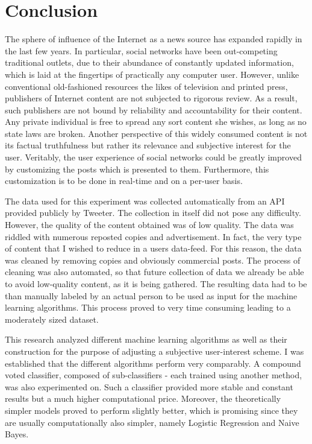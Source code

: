 \section{Conclusion}	
	The sphere of influence of the Internet as a news source has expanded rapidly in the last few years. In particular, social networks have been out-competing traditional outlets, due to their abundance of constantly updated information, which is laid at the fingertips of practically any computer user. However, unlike conventional old-fashioned resources the likes of television and printed press, publishers of Internet content are not subjected to rigorous review. As a result, such publishers are not bound by reliability and accountability for their content. Any private individual is free to spread any sort content she wishes, as long as no state laws are broken. Another perspective of this widely consumed content is not its factual truthfulness but rather its relevance and subjective interest for the user. Veritably, the user experience of social networks could be greatly improved by customizing the posts which is presented to them. Furthermore, this customization is to be done in real-time and on a per-user basis.
	
	\par
	The data used for this experiment was collected automatically from an API provided publicly by Tweeter. The collection in itself did not pose any difficulty. However, the quality of the content obtained was of low quality. The data was riddled with numerous reposted copies and advertisement. In fact, the very type of content that I wished to reduce in a users data-feed. For this reason, the data was cleaned by removing copies and obviously commercial posts. The process of cleaning was also automated, so that future collection of data we already be able to avoid low-quality content, as it is being gathered. The resulting data had to be than manually labeled by an actual person to be used as input for the machine learning algorithms. This process proved to very time consuming leading to a moderately sized dataset.
	
	\par
	
	This research analyzed different machine learning algorithms as well as their construction for the purpose of adjusting a subjective user-interest scheme. I was established that the different algorithms perform very comparably. A compound voted classifier, composed of sub-classifiers - each trained using another method, was also experimented on. Such a classifier provided more stable and constant results but a much higher computational price. Moreover, the theoretically simpler models proved to perform slightly better, which is promising since they are usually computationally also simpler, namely Logistic Regression and Naive Bayes. 
	
